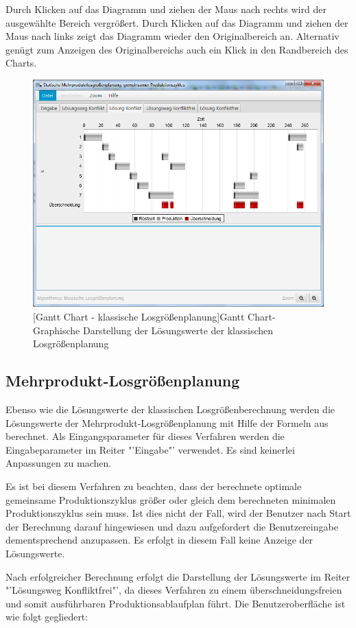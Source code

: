 Durch Klicken auf das Diagramm und ziehen der Maus nach rechts wird der ausgewählte Bereich vergrößert. Durch Klicken auf das Diagramm und ziehen der Maus nach links zeigt das Diagramm wieder den Originalbereich an. Alternativ genügt zum Anzeigen des Originalbereichs auch ein Klick in den Randbereich   des Charts.

\begin{figure}[H]
	\centering
	\includegraphics[width=0.8\linewidth]{Bilder/GanttKlassisch.png} 
	[Gantt Chart - klassische Losgrößenplanung]{Gantt Chart- Graphische Darstellung der Lösungswerte der klassischen Losgrößenplanung}
	\label{fig:ganttklassisch}
\end{figure}

\subsection{Mehrprodukt-Losgrößenplanung}
Ebenso wie die Lösungswerte der klassischen Losgrößenberechnung werden die Lösungswerte der Mehrprodukt-Losgrößenplanung mit Hilfe der Formeln aus \cite{Templ09} berechnet. Als Eingangsparameter für dieses Verfahren werden die Eingabeparameter im Reiter "'Eingabe"' verwendet. Es sind keinerlei Anpassungen zu machen. 

Es ist bei diesem Verfahren zu beachten, dass der berechnete optimale gemeinsame Produktionszyklus größer oder gleich dem berechneten minimalen Produktionszyklus sein muss. Ist dies nicht der Fall, wird der Benutzer nach Start der Berechnung darauf hingewiesen und dazu aufgefordert die Benutzereingabe dementsprechend anzupassen. Es erfolgt in diesem Fall keine Anzeige der Lösungswerte.

Nach erfolgreicher Berechnung erfolgt die Darstellung der Lösungswerte im Reiter "'Lösungsweg Konfliktfrei"', da dieses Verfahren zu einem überschneidungsfreien und somit ausführbaren Produktionsablaufplan führt. Die Benutzeroberfläche ist wie folgt gegliedert:

